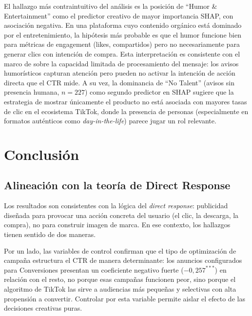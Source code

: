 \documentclass[12pt, a4paper]{report}
\begin{document}
El hallazgo más contraintuitivo del análisis es la posición de ``Humor
\& Entertainment'' como el predictor creativo de mayor importancia SHAP,
con asociación negativa. En una plataforma cuyo contenido orgánico está
dominado por el entretenimiento, la hipótesis más probable es que el
humor funcione bien para métricas de engagement (likes, compartidos)
pero no necesariamente para generar clics con intención de compra. Esta
interpretación es consistente con el marco de \citet{lang2000} sobre la
capacidad limitada de procesamiento del mensaje: los avisos humorísticos
capturan atención pero pueden no activar la intención de acción directa
que el CTR mide. A su vez, la dominancia de ``No Talent'' (avisos sin
presencia humana, $n = 227$) como segundo predictor en SHAP sugiere que
la estrategia de mostrar únicamente el producto no está asociada con
mayores tasas de clic en el ecosistema TikTok, donde la presencia de
personas (especialmente en formatos auténticos como
\textit{day-in-the-life}) parece jugar un rol relevante.

\chapter{Conclusión}

\section{Alineación con la teoría de Direct Response}

Los resultados son consistentes con la lógica del \textit{direct response}: publicidad
diseñada para provocar una acción concreta del usuario (el clic, la descarga, la compra),
no para construir imagen de marca. En ese contexto, los hallazgos tienen sentido de dos
maneras.

Por un lado, las variables de control confirman que el tipo de optimización de campaña
estructura el CTR de manera determinante: los anuncios configurados para Conversiones
presentan un coeficiente negativo fuerte ($-0{,}257^{***}$) en relación con el resto, no
porque esas campañas funcionen peor, sino porque el algoritmo de TikTok las sirve a
audiencias más pequeñas y selectivas con alta propensión a convertir. Controlar por esta
variable permite aislar el efecto de las decisiones creativas puras.
\end{document}
